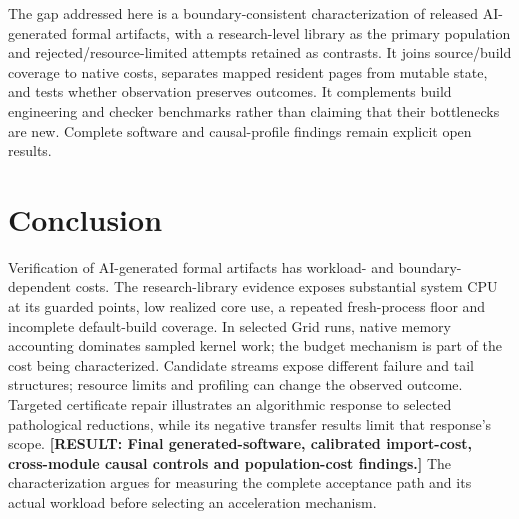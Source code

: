 \documentclass[10pt,twocolumn]{article}
\newcommand{\missing}[1]{\textbf{[RESULT: #1]}}
\begin{document}
The gap addressed here is a boundary-consistent characterization of released
AI-generated formal artifacts, with a research-level library as the primary
population and rejected/resource-limited attempts retained as contrasts.
It joins source/build coverage to native costs, separates mapped resident
pages from mutable state, and tests whether observation preserves outcomes.
It complements build engineering and checker benchmarks rather than claiming
that their bottlenecks are new. Complete software and causal-profile
findings remain explicit open results.
\section{Conclusion}
Verification of AI-generated formal artifacts has workload- and
boundary-dependent costs.
The research-library evidence exposes substantial system CPU at its guarded
points, low realized core use, a repeated fresh-process floor and incomplete
default-build coverage. In selected Grid runs, native memory accounting
dominates sampled kernel work; the budget mechanism is part of the cost
being characterized. Candidate streams expose different failure and tail structures;
resource limits and profiling can change the observed outcome.
Targeted certificate repair illustrates an algorithmic response to selected
pathological reductions, while its negative transfer results limit that
response's scope.
\missing{Final generated-software, calibrated import-cost, cross-module
causal controls and population-cost findings.}
The characterization argues for measuring the complete acceptance path and
its actual workload before selecting an acceleration mechanism.



\end{document}
